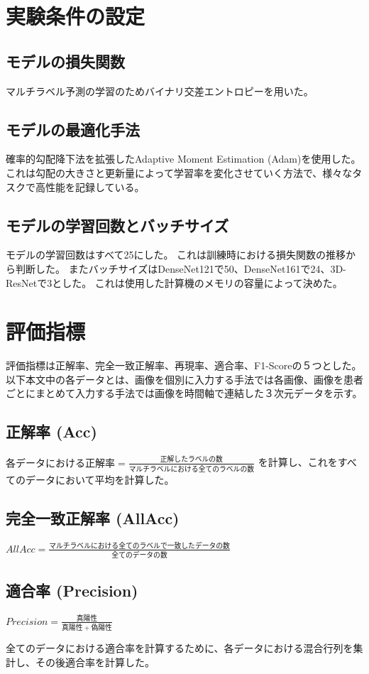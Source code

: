 \section{実験条件の設定}
\subsection{モデルの損失関数}
マルチラベル予測の学習のためバイナリ交差エントロピーを用いた。
\subsection{モデルの最適化手法}
確率的勾配降下法\cite{SGD}を拡張したAdaptive Moment Estimation (Adam)\cite{Adam}を使用した。
これは勾配の大きさと更新量によって学習率を変化させていく方法で、様々なタスクで高性能を記録している。
\subsection{モデルの学習回数とバッチサイズ}
モデルの学習回数はすべて25にした。
これは訓練時における損失関数の推移から判断した。
またバッチサイズはDenseNet121で50、DenseNet161で24、3D-ResNetで3とした。
これは使用した計算機のメモリの容量によって決めた。
\section{評価指標}
評価指標は正解率、完全一致正解率、再現率、適合率、F1-Scoreの５つとした。
以下本文中の各データとは、画像を個別に入力する手法では各画像、画像を患者ごとにまとめて入力する手法では画像を時間軸で連結した３次元データを示す。
\subsection{正解率 (Acc)}
$各データにおける正解率 = \frac{正解したラベルの数}{マルチラベルにおける全てのラベルの数}$
を計算し、これをすべてのデータにおいて平均を計算した。
\subsection{完全一致正解率 (AllAcc)}
$AllAcc=\frac{マルチラベルにおける全てのラベルで一致したデータの数}{全てのデータの数}$
\subsection{適合率 (Precision)}
$Precision = \frac{真陽性}{真陽性+偽陽性}$

全てのデータにおける適合率を計算するために、各データにおける混合行列を集計し、その後適合率を計算した。
